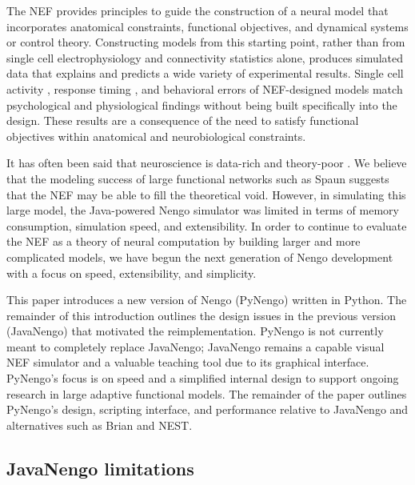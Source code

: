 \documentclass{frontiersSCNS}
\begin{document}
The NEF provides principles
to guide the construction of
a neural model
that incorporates anatomical constraints,
functional objectives, and
dynamical systems or control theory.
Constructing models from this starting point,
rather than from single cell electrophysiology
and connectivity statistics alone,
produces simulated data that explains
and predicts a wide variety of experimental results.
Single cell activity \citep{stewart2012},
response timing \citep{stewart2009a},
and behavioral errors \citep{choo2010}
of NEF-designed models match
psychological and physiological findings
without being built specifically into the design.
These results are a consequence of
the need to satisfy functional objectives
within anatomical and neurobiological constraints.

It has often been said that neuroscience
is data-rich and theory-poor \citep{churchland1992}.
We believe that the modeling success of
large functional networks such as Spaun
suggests that the NEF
may be able to fill the theoretical void.
However, in simulating this large model,
the Java-powered Nengo simulator
was limited in terms of memory consumption,
simulation speed, and extensibility.
In order to continue to evaluate the NEF
as a theory of neural computation
by building larger and more complicated models,
we have begun the next generation
of Nengo development with a focus on speed,
extensibility, and simplicity.

This paper introduces a new version
of Nengo (PyNengo) written in Python.
The remainder of this introduction outlines
the design issues in the previous version (JavaNengo)
that motivated the reimplementation.
PyNengo is not currently meant
to completely replace JavaNengo;
JavaNengo remains a capable visual NEF
simulator and a valuable teaching tool
due to its graphical interface.
PyNengo's focus is on speed
and a simplified internal design
to support ongoing research in
large adaptive functional models.
The remainder of the paper outlines PyNengo's design,
scripting interface, and performance relative to
JavaNengo and alternatives such as Brian and NEST.

\subsection{JavaNengo limitations}
\end{document}

